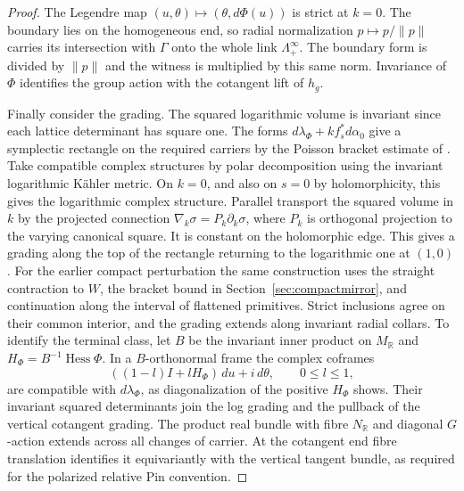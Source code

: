 \begin{proof}
The Legendre map $(u,\theta)\mapsto(\theta,d\Phi(u))$ is strict at $k=0$. The boundary lies on the homogeneous end, so radial normalization $p\mapsto p/\|p\|$ carries its intersection with $\Gamma$ onto the whole link $\Lambda_+^\infty$. The boundary form is divided by $\|p\|$ and the witness is multiplied by this same norm. Invariance of $\Phi$ identifies the group action with the cotangent lift of $h_g$.

Finally consider the grading. The squared logarithmic volume is invariant since each lattice determinant has square one. The forms $d\lambda_\Phi+kf_s^*d\alpha_0$ give a symplectic rectangle on the required carriers by the Poisson bracket estimate of \cite[Lemma~O.5]{FHSZ}. Take compatible complex structures by polar decomposition using the invariant logarithmic Kähler metric. On $k=0$, and also on $s=0$ by holomorphicity, this gives the logarithmic complex structure. Parallel transport the squared volume in $k$ by the projected connection $\nabla_k\sigma=P_k\partial_k\sigma$, where $P_k$ is orthogonal projection to the varying canonical square. It is constant on the holomorphic edge. This gives a grading along the top of the rectangle returning to the logarithmic one at $(1,0)$. For the earlier compact perturbation the same construction uses the straight contraction to $W$, the bracket bound in Section~\ref{sec:compactmirror}, and continuation along the interval of flattened primitives. Strict inclusions agree on their common interior, and the grading extends along invariant radial collars. To identify the terminal class, let $B$ be the invariant inner product on $M_{\mathbb R}$ and $H_\Phi=B^{-1}\operatorname{Hess}\Phi$. In a $B$-orthonormal frame the complex coframes
\[
         ((1-l)I+lH_\Phi)\,du+i\,d\theta,\qquad 0\le l\le1 ,
\]
are compatible with $d\lambda_\Phi$, as diagonalization of the positive $H_\Phi$ shows. Their invariant squared determinants join the log grading and the pullback of the vertical cotangent grading. The product real bundle with fibre $N_{\mathbb R}$ and diagonal $G$-action extends across all changes of carrier. At the cotangent end fibre translation identifies it equivariantly with the vertical tangent bundle, as required for the polarized relative Pin convention.
\end{proof}
